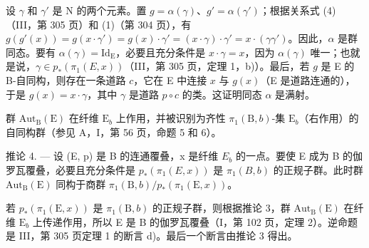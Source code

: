 设 \(\gamma\) 和 \(\gamma'\) 是 N 的两个元素。置 \(g = \alpha(\gamma)\)、\(g' = \alpha(\gamma')\)；根据关系式 (4)（III，第 305 页）和 (1)（第 304 页），有 \(g(g'(x)) = g(x \cdot \gamma') = g(x) \cdot \gamma' = (x \cdot \gamma) \cdot \gamma' = x \cdot (\gamma\gamma')\)。因此，\(\alpha\) 是群同态。要有 \(\alpha(\gamma) = \mathrm{Id}_{\mathrm{E}}\)，必要且充分条件是 \(x \cdot \gamma = x\)，因为 \(\alpha(\gamma)\) 唯一；也就是说，\(\gamma \in p_*(\pi_1(E, x))\)（III，第 305 页，定理 1，b)）。最后，若 \(g\) 是 E 的 B-自同构，则存在一条道路 \(c\)，它在 E 中连接 \(x\) 与 \(g(x)\)（E 是道路连通的），于是 \(g(x) = x \cdot \gamma\)，其中 \(\gamma\) 是道路 \(p \circ c\) 的类。这证明同态 \(\alpha\) 是满射。

群 \(\mathrm{Aut}_{\mathrm{B}}(\mathrm{E})\) 在纤维 \(\mathrm{E}_b\) 上作用，并被识别为齐性 \(\pi_1(\mathrm{B},b)\)-集 \(\mathrm{E}_b\)（右作用）的自同构群（参见 A，I，第 56 页，命题 5 和 6）。

推论 4. --- 设 (E, p) 是 B 的连通覆叠，x 是纤维 \(E_{b}\) 的一点。要使 E 成为 B 的伽罗瓦覆叠，必要且充分条件是 \(p_{*}(\pi_{1}(E, x))\) 是 \(\pi_{1}(B, b)\) 的正规子群。此时群 \(\mathrm{Aut}_{\mathrm{B}}(\mathrm{E})\) 同构于商群 \(\pi_{1}(\mathrm{B}, b)/p_{*}(\pi_{1}(\mathrm{E}, x))\)。

若 \(p_{*}(\pi_{1}(\mathrm{E},x))\) 是 \(\pi_1(\mathrm{B},b)\) 的正规子群，则根据推论 3，群 \(\mathrm{Aut}_{\mathrm{B}}(\mathrm{E})\) 在纤维 \(\mathrm{E}_b\) 上传递作用，所以 E 是 B 的伽罗瓦覆叠（I，第 102 页，定理 2）。逆命题是 III，第 305 页定理 1 的断言 d)。最后一个断言由推论 3 得出。

